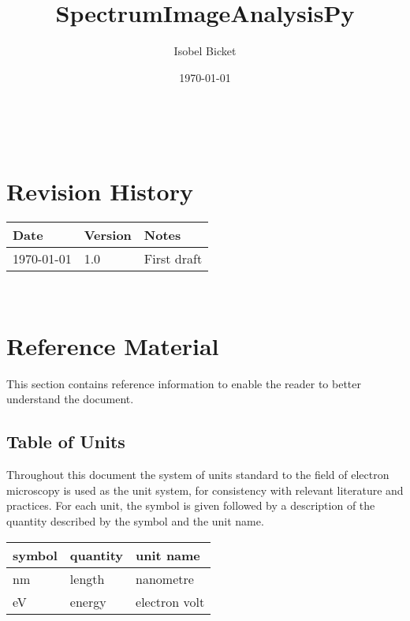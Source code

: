 \documentclass[12pt]{article}
\begin{document}

\title{SpectrumImageAnalysisPy} 
\author{Isobel Bicket}
\date{\today}
	
\maketitle

~\newpage



\section{Revision History}

\begin{tabularx}{\textwidth}{p{4cm}p{2cm}X}
	\toprule {\bf Date} & {\bf Version} & {\bf Notes}\\
	\midrule
	\today & 1.0 & First draft\\
	\bottomrule
\end{tabularx}

~\newpage

\tableofcontents

\section{Reference Material}

This section contains reference information to enable the reader to better understand the document.

\subsection{Table of Units}

Throughout this document the system of units standard to the field of electron microscopy is used
as the unit system, for consistency with relevant literature and practices. For each unit, the symbol is given followed by a
description of the quantity described by the symbol and the unit name.
~\newline

\renewcommand{\arraystretch}{1.2}
  \noindent \begin{tabular}{l l l} 
    \toprule		
    \textbf{symbol} & \textbf{quantity} & \textbf{unit name}\\
    \midrule 
    \si{\nano\metre} & length & nanometre\\
    \si{\electronvolt} & energy	& electron volt\\
    \bottomrule
  \end{tabular}
\end{document}

